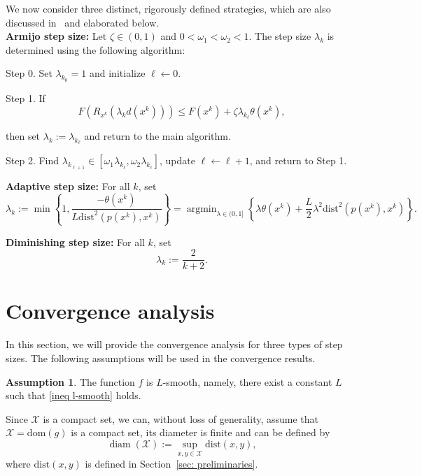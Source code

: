 \documentclass[pdflatex,sn-mathphys-num]{sn-jnl}%
\theoremstyle{definition} %
\newtheorem{assumption}{Assumption} %
\theoremstyle{remark} %
\newcommand{\grad}{\mathrm{grad}}
\newcommand{\dist}{\mathrm{dist}}
\begin{document}
We now consider three distinct, rigorously defined strategies, which are also discussed in~\cite{assunccao2021conditional} and elaborated below. 
~\\   

\noindent\textbf{Armijo step size:} Let \( \zeta \in (0,1) \) and \( 0 < \omega_1 < \omega_2 < 1 \). The step size \( \lambda_k \) is determined using the following algorithm:

Step 0. Set $\lambda_{k_0}=1$ and initialize $\ell \leftarrow 0$.

Step 1. If
$$
F(R_{x^k} ( \lambda_k d(x^k))) \leq F(x^k)+\zeta \lambda_{k_{\ell}} \theta (x^k),
$$

\hspace{28pt}  then set $\lambda_k:=\lambda_{k_{\ell}}$ and return to the main algorithm.

Step 2. Find $\lambda_{k_{\ell+1}} \in\left[\omega_1 \lambda_{k_{\ell}}, \omega_2 \lambda_{k_{\ell}}\right]$, update $\ell \leftarrow \ell+1$, and return to Step 1.


\noindent\textbf{Adaptive step size:} For all $k$, set
$$
\lambda_k:=\min \left\{1, \frac{-\theta(x^k)}{L \dist^2(p\left(x^k\right), x^k)}\right\}
=\operatorname{argmin}_{\lambda \in(0,1]}\left\{ \lambda\theta(x^k)+\frac{L}{2} \lambda^2 \dist^2(p(x^k), x^k) \right\} .
$$


\noindent\textbf{Diminishing step size:} For all $k$, set
$$
\lambda_k:=\frac{2}{k+2} .
$$


\section{Convergence analysis}\label{sec4} 
In this section, we will provide the convergence analysis for three types of step sizes. The following assumptions will be used in the convergence results.

\begin{assumption}\label{assu Lsmooth}
    The function $f$ is $L$-smooth, namely, there exist a constant  $L$ such that \eqref{ineq l-smooth} holds.
\end{assumption}


Since $\mathcal{X}$ is a compact set, we can, without loss of generality, assume that $\mathcal{X} =  \mathrm{dom}(g) $ is a compact set, its diameter is finite and can be defined by 
\begin{equation}
    \operatorname{diam}(\mathcal{X}):=\sup _{x, y \in \mathcal{X}} \dist(x, y),
\end{equation}
where $\dist(x, y)$ is defined in Section~\ref{sec: preliminaries}.
\end{document}
